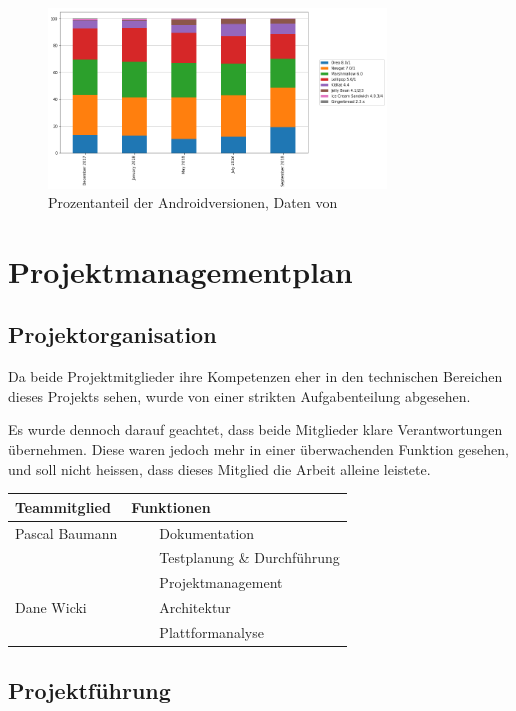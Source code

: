 \documentclass[a4paper]{scrreprt}
\newcommand{\tabitem}{~~\llap{\textbullet}~~}
\begin{document}
\begin{figure}
	\centering
	\includegraphics[keepaspectratio,width=0.8\textwidth]{AndroidMarketshare}
	\caption{Prozentanteil der Androidversionen, Daten von \cite{Fossbytes2018}}
	\label{fig:AndroidMarketshare}
\end{figure}


\newpage
\section{Projektmanagementplan}

\subsection{Projektorganisation}
Da beide Projektmitglieder ihre Kompetenzen eher in den technischen Bereichen dieses Projekts sehen, wurde von einer strikten Aufgabenteilung abgesehen.

Es wurde dennoch darauf geachtet, dass beide Mitglieder klare Verantwortungen übernehmen. Diese waren jedoch mehr in einer überwachenden Funktion gesehen, und soll nicht heissen, dass dieses Mitglied die Arbeit alleine leistete.

\vspace{1em}

\begin{tabularx}{\textwidth}{|X|X|}
	\hline
	\textbf{Teammitglied} & \textbf{Funktionen} \\
	\hline
	Pascal Baumann & \tabitem Dokumentation \\
	& \tabitem Testplanung \& Durchführung \\
	& \tabitem Projektmanagement \\
	\hline
	Dane Wicki & \tabitem Architektur \\
	& \tabitem Plattformanalyse \\
	\hline
\end{tabularx}

\newpage
\subsection{Projektführung}
\end{document}
